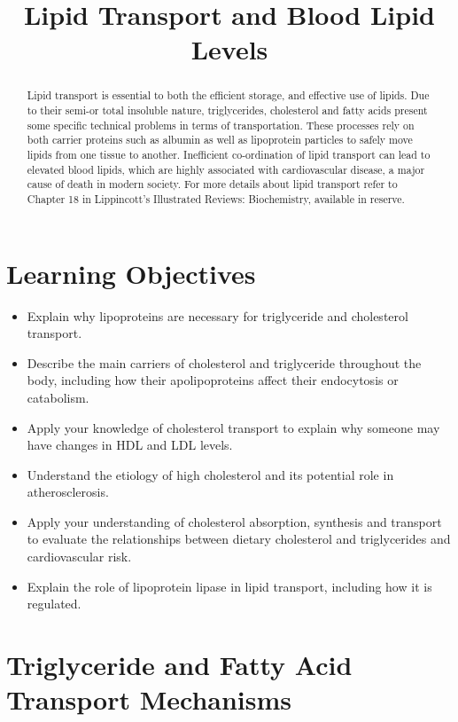 \documentclass{tufte-handout}
\title{Lipid Transport and Blood Lipid Levels}
\author{}
\date{}  %
\begin{document}
\maketitle%

\begin{abstract}
\noindent  Lipid transport is essential to both the efficient storage, and effective use of lipids.  Due to their semi-or total insoluble nature, triglycerides, cholesterol and fatty acids present some specific technical problems in terms of transportation.  These processes rely on both carrier proteins such as albumin as well as lipoprotein particles to safely move lipids from one tissue to another.  Inefficient co-ordination of lipid transport can lead to elevated blood lipids, which are highly associated with cardiovascular disease, a major cause of death in modern society.  For more details about lipid transport refer to Chapter 18 in Lippincott's Illustrated Reviews: Biochemistry, available in reserve\cite{Ferrier2017}.
\end{abstract}

\tableofcontents

\pagebreak
\section{Learning Objectives}

\begin{itemize}
\item Explain why lipoproteins are necessary for triglyceride and cholesterol transport.
\item Describe the main carriers of cholesterol and triglyceride throughout the body, including how their apolipoproteins affect their endocytosis or catabolism.
\item Apply your knowledge of cholesterol transport to explain why someone may have changes in HDL and LDL levels.
\item Understand the etiology of high cholesterol and its potential role in atherosclerosis.  
\item Apply your understanding of cholesterol absorption, synthesis and transport to evaluate the relationships between dietary cholesterol and triglycerides and cardiovascular risk.
\item Explain the role of lipoprotein lipase in lipid transport, including how it is regulated.

\end{itemize}
\section{Triglyceride and Fatty Acid Transport Mechanisms}
\end{document}
